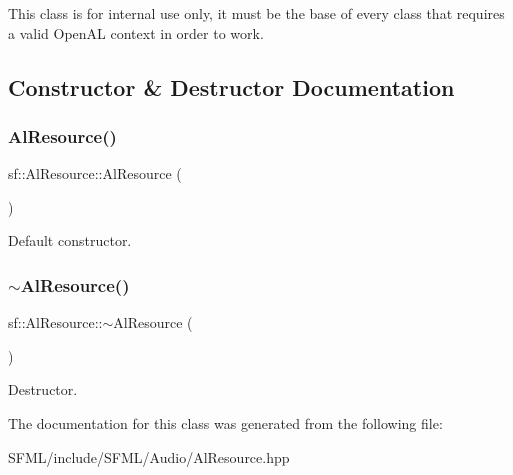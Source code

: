 \begin{DoxyVerb}\end{DoxyVerb}


This class is for internal use only, it must be the base of every class that requires a valid Open\+AL context in order to work. \begin{DoxyVerb}\end{DoxyVerb}
 

\subsection{Constructor \& Destructor Documentation}
\mbox{\label{classsf_1_1_al_resource_a51b4f3a825c5d68386f8683e3e1053d7}} 
\subsubsection{\texorpdfstring{AlResource()}{AlResource()}}
{\footnotesize\ttfamily sf\+::\+Al\+Resource\+::\+Al\+Resource (\begin{DoxyParamCaption}{ }\end{DoxyParamCaption})\hspace{0.3cm}{\ttfamily [protected]}}



Default constructor. 

\begin{DoxyVerb}\end{DoxyVerb}
 \mbox{\label{classsf_1_1_al_resource_a74ad78198cddcb6e5d847177364049db}} 
\subsubsection{\texorpdfstring{$\sim$AlResource()}{~AlResource()}}
{\footnotesize\ttfamily sf\+::\+Al\+Resource\+::$\sim$\+Al\+Resource (\begin{DoxyParamCaption}{ }\end{DoxyParamCaption})\hspace{0.3cm}{\ttfamily [protected]}}



Destructor. 

\begin{DoxyVerb}\end{DoxyVerb}
 

The documentation for this class was generated from the following file\+:\begin{DoxyCompactItemize}
\item 
S\+F\+M\+L/include/\+S\+F\+M\+L/\+Audio/Al\+Resource.\+hpp\end{DoxyCompactItemize}

